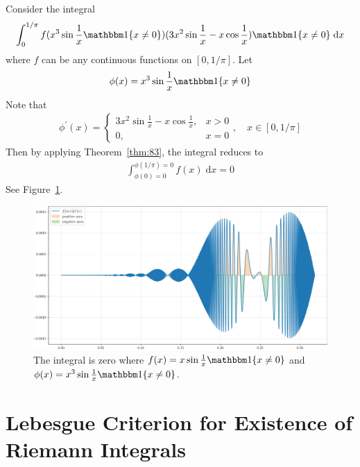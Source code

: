 \documentclass[thmcnt=section, 12pt]{my-elegantbook}
\begin{document}
\begin{example} \label{eg:15}
    Consider the integral
    \begin{align*}
        \int_{0}^{1 / \pi} f(x^3 \sin \frac{1}{x} \ind\{x \neq 0\})
        (3x^2 \sin \frac{1}{x} - x\cos\frac{1}{x})
        \ind\{x \neq 0\} \; \mathrm{d} x
    \end{align*}
    where $f$ can be any continuous functions on $[0, 1 / \pi]$.
    Let
    \begin{align*}
        \phi(x) = x^3 \sin\frac{1}{x} \ind\{x \neq 0\}
    \end{align*}
    Note that
    \begin{align*}
        \phi^\prime(x) =
        \begin{cases}
            3x^2 \sin \frac{1}{x} - x\cos\frac{1}{x},
             & x > 0 \\
            0,
             & x = 0
        \end{cases},
        \quad
        x \in [0, 1 / \pi]
    \end{align*}
    Then by applying Theorem~\ref{thm:83}, the integral
    reduces to
    \begin{align*}
        \int_{\phi(0) = 0}^{\phi(1 / \pi) = 0} f(x) \; \mathrm{d} x
        = 0
    \end{align*}
    See Figure~\ref{fig:18}.

    \begin{figure}[ht]
        \centering
        \includegraphics[scale=0.5]{figures/ma-018.png}
        \caption{The integral is zero where $f(x) = x \sin\frac{1}{x} \ind\{ x \neq 0 \}$ and $\phi(x) = x^3 \sin \frac{1}{x} \ind\{x \neq 0\}$.}
        \label{fig:18}
    \end{figure}
\end{example}


\section{Lebesgue Criterion for Existence of Riemann Integrals}
\end{document}
